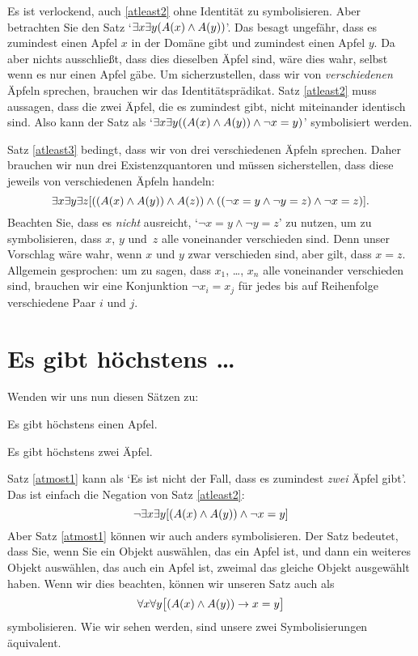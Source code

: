 Es ist verlockend, auch \ref{atleast2} ohne Identität zu symbolisieren. Aber betrachten Sie den Satz `$\exists x \exists y(\mathord{A}(x) \wedge \mathord{A}(y))$'. Das besagt ungefähr, dass es zumindest einen Apfel $x$ in der Domäne gibt und zumindest einen Apfel $y$. Da aber nichts ausschlie{\ss}t, dass dies dieselben Äpfel sind, wäre dies wahr, selbst wenn es nur einen Apfel gäbe. Um sicherzustellen, dass wir von \emph{verschiedenen} Äpfeln sprechen, brauchen wir das Identitätsprädikat. Satz \ref{atleast2} muss aussagen, dass die zwei Äpfel, die es zumindest gibt, nicht miteinander identisch sind. Also kann der Satz als `$\exists x \exists y((\mathord{A}(x) \wedge \mathord{A}(y)) \wedge \neg x = y)$' symbolisiert werden.

Satz \ref{atleast3} bedingt, dass wir von drei verschiedenen Äpfeln sprechen. Daher brauchen wir nun drei Existenzquantoren und müssen sicherstellen, dass diese jeweils von verschiedenen Äpfeln handeln: 
\[
	\exists x \exists y\exists z[((\mathord{A}(x) \wedge \mathord{A}(y)) \wedge \mathord{A}(z)) \wedge ((\neg x = y \wedge \neg y = z) \wedge \neg x = z)].
\]
Beachten Sie, dass es \emph{nicht} ausreicht, `$\lnot x = y \land \lnot y = z$' zu nutzen, um zu symbolisieren, dass $x$, $y$ und~$z$ alle voneinander verschieden sind. Denn unser Vorschlag wäre wahr, wenn $x$ und $y$ zwar verschieden sind, aber gilt, dass $x = z$. Allgemein gesprochen: um zu sagen, dass $x_1$, \dots, $x_n$ alle voneinander verschieden sind, brauchen wir eine Konjunktion $\lnot x_i = x_j$ für jedes bis auf Reihenfolge verschiedene Paar $i$ und $j$.

\section{Es gibt höchstens \ldots}
Wenden wir uns nun diesen Sätzen zu:
\begin{earg}
	\item[\ex{atmost1}] Es gibt höchstens einen Apfel.
	\item[\ex{atmost2}] Es gibt höchstens zwei Äpfel.
\end{earg}
Satz \ref{atmost1} kann als `Es ist nicht der Fall, dass es zumindest \emph{zwei} Äpfel gibt'. Das ist einfach die Negation von Satz \ref{atleast2}: 
$$\neg \exists x \exists y[(\mathord{A}(x) \wedge \mathord{A}(y)) \wedge \neg x = y]$$
Aber Satz \ref{atmost1} können wir auch anders symbolisieren. Der Satz bedeutet, dass Sie, wenn Sie ein Objekt auswählen, das ein Apfel ist, und dann ein weiteres Objekt auswählen, das auch ein Apfel ist, zweimal das gleiche Objekt ausgewählt haben. Wenn wir dies beachten, können wir unseren Satz auch als 
$$\forall x\forall y\bigl[(\mathord{A}(x) \wedge \mathord{A}(y)) \rightarrow x=y\bigr]$$
symbolisieren. Wie wir sehen werden, sind unsere zwei Symbolisierungen äquivalent.

